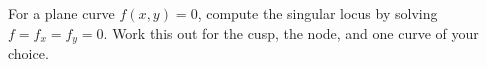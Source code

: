 \begin{problem}
For a plane curve $f(x,y)=0$, compute the singular locus by solving $f=f_x=f_y=0$. Work this out for the cusp, the node, and one curve of your choice.
\end{problem}
